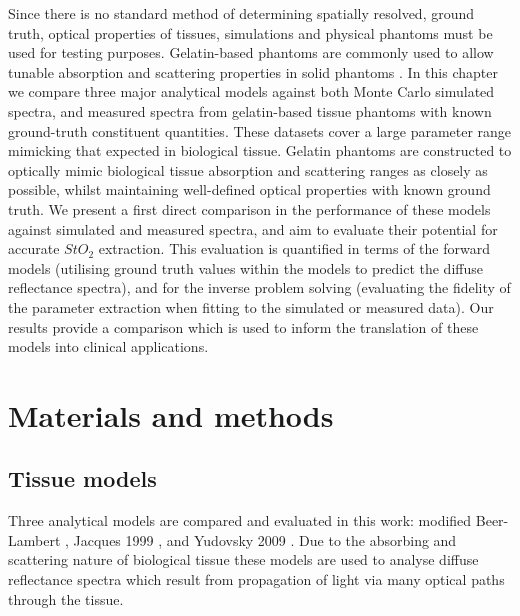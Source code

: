 Since there is no standard method of determining spatially resolved, ground truth, optical properties of tissues, 
simulations and physical
phantoms must be used
for testing purposes.
Gelatin-based phantoms are commonly used to allow tunable absorption and scattering properties in solid phantoms \cite{Pogue2006, Gautam2023}.
%
In this chapter we compare three major analytical models against both Monte Carlo simulated spectra, and measured spectra from gelatin-based tissue phantoms with known ground-truth constituent quantities. These datasets cover a large parameter range mimicking that expected in biological tissue\cite{Jacques2013}. Gelatin phantoms are constructed to optically mimic biological tissue absorption and scattering ranges as closely as possible, whilst maintaining well-defined optical properties with known ground truth. We present a first direct comparison in the performance of these models against simulated and measured spectra, and aim to evaluate their potential for accurate $StO_2$ extraction. This evaluation is quantified in terms of the forward models (utilising ground truth values within the models to predict the diffuse reflectance spectra), and for the inverse problem solving (evaluating the fidelity of the parameter extraction when fitting to the simulated or measured data).
Our results provide a comparison which is used to inform the translation of these models into clinical applications.

\section{Materials and methods}\label{sec:methods}
\subsection{Tissue models}\label{sec:methodtissuemodels}
Three analytical models are compared and evaluated in this work: modified Beer-Lambert \cite{Clancy2015}, Jacques 1999 \cite{Jacques1999}, and Yudovsky 2009 \cite{Yudovsky2009}. Due to the absorbing and scattering nature of biological tissue these models are used to analyse diffuse reflectance spectra which result from propagation of light via many optical paths through the tissue.

